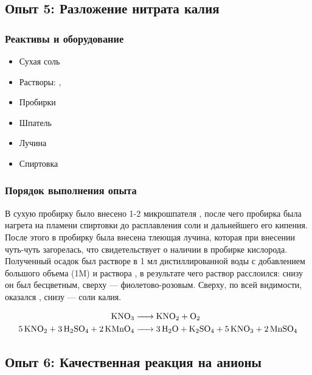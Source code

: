 \documentclass[a4paper, 12pt]{article}
\begin{document}

\subsection{Опыт 5: Разложение нитрата калия}

\subsubsection{Реактивы и оборудование}

\begin{itemize}
	\item Сухая соль 
	
	\item Растворы: , 
	
	\item Пробирки
	
	\item Шпатель
	
	\item Лучина
	
	\item Спиртовка
\end{itemize}

\subsubsection{Порядок выполнения опыта}

В сухую пробирку было внесено 1-2 микрошпателя , после чего пробирка была нагрета на пламени спиртовки до расплавления соли и дальнейшего его кипения. После этого в пробирку была внесена тлеющая лучина, которая при внесении чуть-чуть загорелась, что свидетельствует о наличии в пробирке кислорода. Полученный осадок был растворе в 1 мл дистиллированной воды с добавлением большого объема  (1M) и раствора , в результате чего раствор расслоился: снизу он был бесцветным, сверху --- фиолетово-розовым. Сверху, по всей видимости, оказался , снизу --- соли калия. %

\begin{align}
	\ce{KNO3 &-> KNO2 + O2}\\
	\ce{5 KNO2 + 3 H2SO4 + 2 KMnO4 &-> 3 H2O + K2SO4 + 5 KNO3 + 2 MnSO4}
\end{align}

\subsection{Опыт 6: Качественная реакция на анионы}
\end{document}
